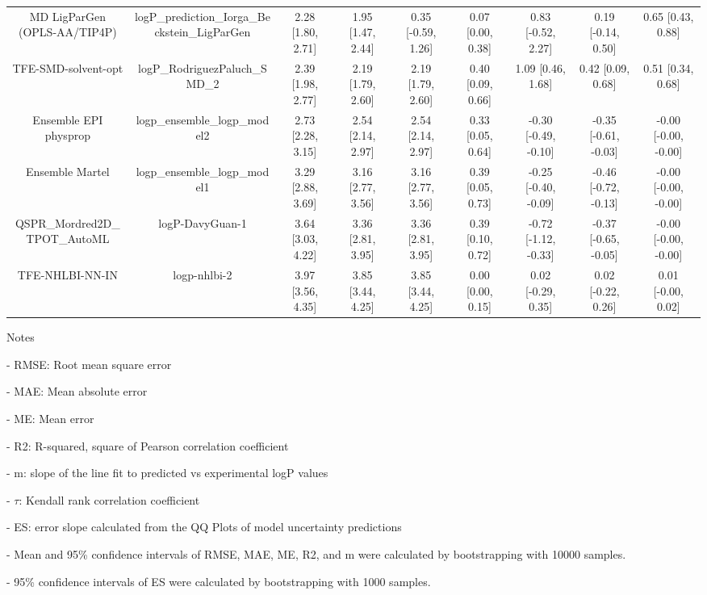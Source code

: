 \documentclass{article}
\begin{document}
\begin{center}
\begin{longtable}{|ccccccccc|}
MD LigParGen (OPLS-AA/TIP4P) & logP\_prediction\_Iorga\_Beckstein\_LigParGen & 2.28 [1.80, 2.71] & 1.95 [1.47, 2.44] &   0.35 [-0.59, 1.26] & 0.07 [0.00, 0.38] &   0.83 [-0.52, 2.27] &   0.19 [-0.14, 0.50] &    0.65 [0.43, 0.88] \\
         TFE-SMD-solvent-opt &                 logP\_RodriguezPaluch\_SMD\_2 & 2.39 [1.98, 2.77] & 2.19 [1.79, 2.60] &    2.19 [1.79, 2.60] & 0.40 [0.09, 0.66] &    1.09 [0.46, 1.68] &    0.42 [0.09, 0.68] &    0.51 [0.34, 0.68] \\
       Ensemble EPI physprop &                  logp\_ensemble\_logp\_model2 & 2.73 [2.28, 3.15] & 2.54 [2.14, 2.97] &    2.54 [2.14, 2.97] & 0.33 [0.05, 0.64] & -0.30 [-0.49, -0.10] & -0.35 [-0.61, -0.03] & -0.00 [-0.00, -0.00] \\
             Ensemble Martel &                  logp\_ensemble\_logp\_model1 & 3.29 [2.88, 3.69] & 3.16 [2.77, 3.56] &    3.16 [2.77, 3.56] & 0.39 [0.05, 0.73] & -0.25 [-0.40, -0.09] & -0.46 [-0.72, -0.13] & -0.00 [-0.00, -0.00] \\
  QSPR_Mordred2D_TPOT_AutoML &                               logP-DavyGuan-1 & 3.64 [3.03, 4.22] & 3.36 [2.81, 3.95] &    3.36 [2.81, 3.95] & 0.39 [0.10, 0.72] & -0.72 [-1.12, -0.33] & -0.37 [-0.65, -0.05] & -0.00 [-0.00, -0.00] \\
             TFE-NHLBI-NN-IN &                                  logp-nhlbi-2 & 3.97 [3.56, 4.35] & 3.85 [3.44, 4.25] &    3.85 [3.44, 4.25] & 0.00 [0.00, 0.15] &   0.02 [-0.29, 0.35] &   0.02 [-0.22, 0.26] &   0.01 [-0.00, 0.02] \\
\end{longtable}
\end{center}

Notes

- RMSE: Root mean square error

- MAE: Mean absolute error

- ME: Mean error

- R2: R-squared, square of Pearson correlation coefficient

- m: slope of the line fit to predicted vs experimental logP values

- $\tau$:  Kendall rank correlation coefficient

- ES: error slope calculated from the QQ Plots of model uncertainty predictions

- Mean and 95\% confidence intervals of RMSE, MAE, ME, R2, and m were calculated by bootstrapping with 10000 samples.

- 95\% confidence intervals of ES were calculated by bootstrapping with 1000 samples.\end{document}
\end{document}
